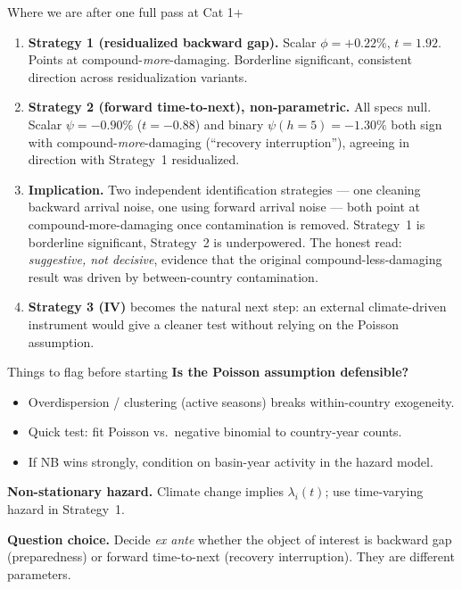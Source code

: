\documentclass[aspectratio=169]{beamer}
\begin{document}
\begin{frame}{Where we are after one full pass at Cat 1+}
\begin{enumerate}
  \item \textbf{Strategy 1 (residualized backward gap).} Scalar $\phi = +0.22\%$, $t=1.92$. Points at compound-\emph{more}-damaging. Borderline significant, consistent direction across residualization variants.

  \medskip
  \item \textbf{Strategy 2 (forward time-to-next), non-parametric.} All specs null. Scalar $\psi = -0.90\%$ ($t=-0.88$) and binary $\psi(h{=}5) = -1.30\%$ both sign with compound-\emph{more}-damaging (``recovery interruption''), agreeing in direction with Strategy~1 residualized.

  \medskip
  \item \textbf{Implication.} Two independent identification strategies --- one cleaning backward arrival noise, one using forward arrival noise --- both point at compound-more-damaging once contamination is removed. Strategy~1 is borderline significant, Strategy~2 is underpowered. The honest read: \emph{suggestive, not decisive}, evidence that the original compound-less-damaging result was driven by between-country contamination.

  \medskip
  \item \textbf{Strategy 3 (IV)} becomes the natural next step: an external climate-driven instrument would give a cleaner test without relying on the Poisson assumption.
\end{enumerate}
\end{frame}

\begin{frame}{Things to flag before starting}
\textbf{Is the Poisson assumption defensible?}
\begin{itemize}
  \item Overdispersion / clustering (active seasons) breaks within-country exogeneity.
  \item Quick test: fit Poisson vs.\ negative binomial to country-year counts.
  \item If NB wins strongly, condition on basin-year activity in the hazard model.
\end{itemize}

\medskip
\textbf{Non-stationary hazard.} Climate change implies $\lambda_i(t)$; use time-varying hazard in Strategy~1.

\medskip
\textbf{Question choice.} Decide \emph{ex ante} whether the object of interest is backward gap (preparedness) or forward time-to-next (recovery interruption). They are different parameters.
\end{frame}
\end{document}
